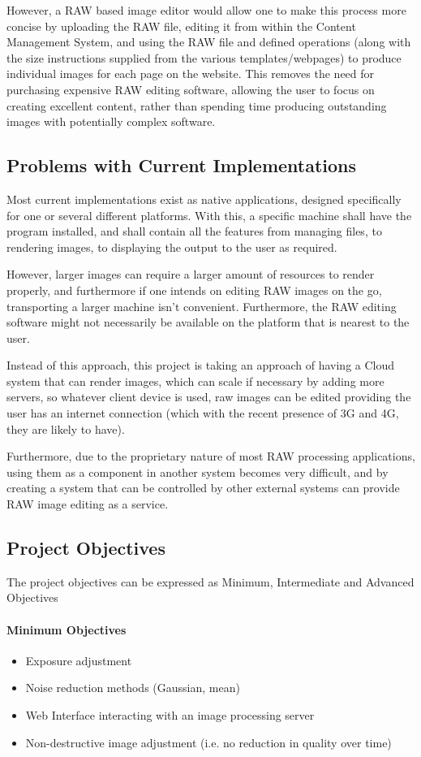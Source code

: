 \documentclass[11pt,a4paper]{article}
\begin{document}
However, a RAW based image editor would allow one to make this process more concise by uploading the RAW file, editing it from within
the Content Management System, and using the RAW file and defined operations (along with the size instructions supplied from the various
templates/webpages) to produce individual images for each page on the website. This removes the need for purchasing expensive RAW editing software,
allowing the user to focus on creating excellent content, rather than spending time producing outstanding images with potentially complex software.

\subsection{Problems with Current Implementations}
Most current implementations exist as native applications, designed specifically for one or several different platforms.
With this, a specific machine shall have the program installed, and shall contain all the features from managing files, to
rendering images, to displaying the output to the user as required. 

However, larger images can require a larger amount of resources to render properly, and furthermore if one intends on editing RAW images
on the go, transporting a larger machine isn't convenient. Furthermore, the RAW editing software might not necessarily be available on the platform
that is nearest to the user. 

Instead of this approach, this project is taking an approach of having a Cloud system that can render images, which can scale if necessary by adding more
servers, so whatever client device is used, raw images can be edited providing the user has an internet connection (which with the recent presence of 3G and 4G,
they are likely to have).

Furthermore, due to the proprietary nature of most RAW processing applications, using them as a component in another system becomes very difficult,
and by creating a system that can be controlled by other external systems can provide RAW image editing as a service.

\subsection{Project Objectives}
The project objectives can be expressed as Minimum, Intermediate and Advanced Objectives


\paragraph{Minimum Objectives}
    \begin{itemize}
      \item Exposure adjustment
      \item Noise reduction methods (Gaussian, mean)
      \item Web Interface interacting with an image processing server
      \item Non-destructive image adjustment (i.e. no reduction in quality over time)
    \end{itemize}
\end{document}
